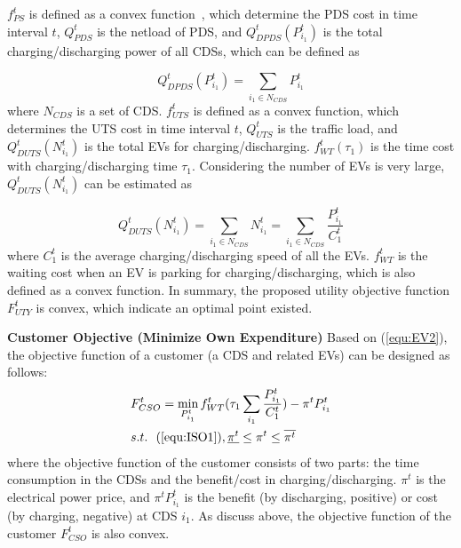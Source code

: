\documentclass[final]{IEEEtran}
\begin{document}
$f^t_{PS}$ is defined as a convex function~\cite{park2005particle}, which determine the PDS cost in time interval $t$,  $Q^t_{PDS}$ is the netload of PDS, and $Q^t_{DPDS} (P^t_{i_1})$ is the total charging/discharging power of all CDSs, which can be defined as

\begin{equation}
Q^t_{DPDS} (P^t_{i_1}) = \sum_{i_1 \in N_{CDS}}P^t_{i_1} \label{equ:EV1}
\end{equation}
where $N_{CDS}$ is a set of CDS. $f^t_{UTS}$ is defined as a convex function, which determines the UTS cost in time interval $t$, $Q^t_{UTS}$ is the traffic load, and $Q^t_{DUTS} (N^t_{i_1})$ is the total EVs for charging/discharging. $f^t_{WT}(\tau_1)$ is the time cost with charging/discharging time $\tau_1$. Considering the number of EVs is very large, $Q^t_{DUTS} (N^t_{i_1})$ can be estimated as

\begin{equation}
Q^t_{DUTS} (N^t_{i_1}) = \sum_{i_1 \in N_{CDS}}N^t_{i_1} = \sum_{i_1 \in N_{CDS}}\frac{P^t_{i_1}}{C^t_1} \label{equ:EV2}
\end{equation}
where $C^t_1$ is the average charging/discharging speed of all the EVs. $f^t_{WT}$ is the waiting cost when an EV is parking for charging/discharging, which is also defined as a convex function. 
In summary, the proposed utility objective function $F^t_{UTY}$ is convex, which indicate an optimal point existed.

\textbf{Customer Objective (Minimize Own Expenditure)}
Based on (\ref{equ:EV2}), the objective function of a customer (a CDS and related EVs) can be designed as follows:
\begin{subequations}\label{equ:obj_cus}
	\begin{align}
	& F^t_{CSO} = \min_{P^t_{i_1}}f^t_{WT}(\tau_1\sum_{i_1} \frac{P^t_{i_1}}{C^t_1}) - \pi^t P^t_{i_1} \label{equ:cus1}\\
	& s.t.\ \ (\ref{equ:ISO1}),  \underline{\pi^t}\leq \pi^t \leq \overline{\pi^t} \label{equ:cus2}
	\end{align}
\end{subequations}
where the objective function of the customer consists of two parts: the time consumption in the CDSs and the benefit/cost in charging/discharging. $\pi^t$ is the electrical power price, and $\pi^t P^t_{i_1}$ is the benefit (by discharging, positive) or cost (by charging, negative) at CDS $i_1$. As discuss above, the objective function of the customer $F^t_{CSO}$ is also convex.
\end{document}
